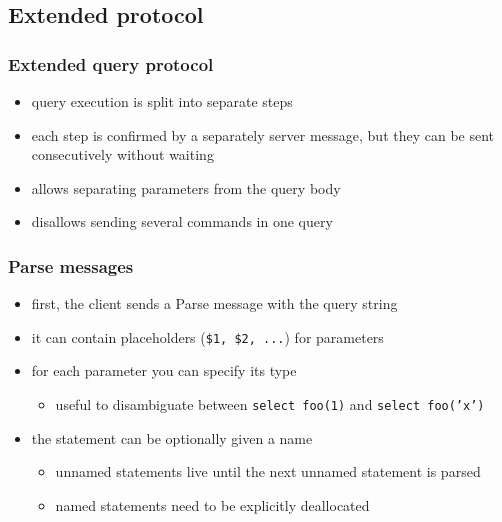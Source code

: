 \documentclass{beamer}
\begin{document}
\subsection{Extended protocol}
\begin{frame}
  \frametitle{Extended query protocol}

  \begin{itemize}
  \item query execution is split into separate steps
  \item each step is confirmed by a separately server message, but they can be
    sent consecutively without waiting
  \item allows separating parameters from the query body
  \end{itemize}
  \begin{itemize}
  \item disallows sending several commands in one query
  \end{itemize}
\end{frame}

\begin{frame}
  \frametitle{Parse messages}

  \begin{itemize}
  \item first, the client sends a Parse message with the query string
  \item it can contain placeholders (\texttt{\$1, \$2, ...}) for parameters
  \item for each parameter you can specify its type
    \begin{itemize}
    \item useful to disambiguate between \texttt{select foo(1)} and
      \texttt{select foo('x')}
    \end{itemize}
  \item the statement can be optionally given a name
    \begin{itemize}
    \item unnamed statements live until the next unnamed statement is parsed
    \item named statements need to be explicitly deallocated
    \end{itemize}
  \end{itemize}


\end{frame}
\end{document}
